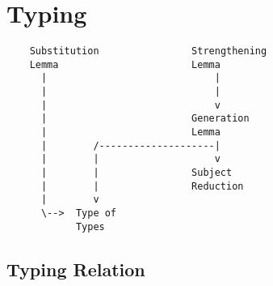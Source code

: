 \section{Typing}


{\scriptsize
\begin{verbatim}
    Substitution                Strengthening
    Lemma                       Lemma
      |                             |
      |                             |
      |                             v
      |                         Generation
      |                         Lemma
      |        /--------------------|
      |        |                    v
      |        |                Subject
      |        |                Reduction
      |        v
      \-->  Type of
            Types
\end{verbatim}
}





\subsection{Typing Relation}


